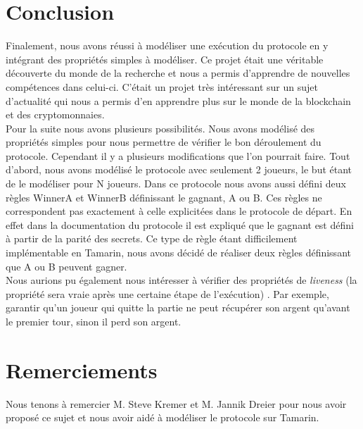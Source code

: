\documentclass[conference]{IEEEtran}
\begin{document}
\section{Conclusion}
Finalement, nous avons réussi à modéliser une exécution du protocole en y intégrant des propriétés simples à modéliser. Ce projet était une véritable découverte du monde de la recherche et nous a permis d'apprendre de nouvelles compétences dans celui-ci. C'était un projet très intéressant sur un sujet d'actualité qui nous a permis d'en apprendre plus sur le monde de la blockchain et des cryptomonnaies. \\

Pour la suite nous avons plusieurs possibilités. Nous avons modélisé des propriétés simples pour nous permettre de vérifier le bon déroulement du protocole. Cependant il y a plusieurs modifications que l'on pourrait faire. Tout d'abord, nous avons modélisé le protocole avec seulement 2 joueurs, le but étant de le modéliser pour N joueurs. Dans ce protocole nous avons aussi défini deux règles WinnerA et WinnerB définissant le gagnant, A ou B. Ces règles ne correspondent pas exactement à celle explicitées dans le protocole de départ. En effet dans la documentation du protocole il est expliqué que le gagnant est défini à partir de la parité des secrets. Ce type de règle étant difficilement implémentable en Tamarin, nous avons décidé de réaliser deux règles définissant que A ou B peuvent gagner. \\

Nous aurions pu également nous intéresser à vérifier des propriétés de \textit{liveness} (la propriété sera vraie après une certaine étape de l'exécution) \cite{vivacite}.
Par exemple, garantir qu'un joueur qui quitte la partie ne peut récupérer son argent qu'avant le premier tour, sinon il perd son argent.


\section{Remerciements}
Nous tenons à remercier M. Steve Kremer et M. Jannik Dreier pour nous avoir proposé ce sujet et nous avoir aidé à modéliser le protocole sur Tamarin. 



\newpage


\end{document}
